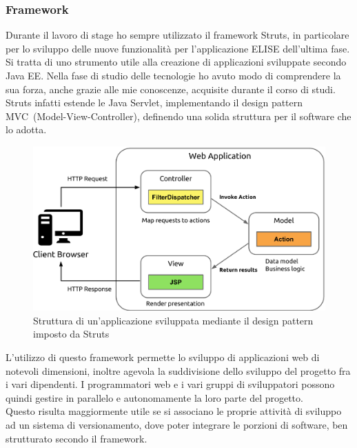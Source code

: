 	\subsubsection{Framework}
	Durante il lavoro di stage ho sempre utilizzato il framework Struts, in particolare per lo sviluppo delle nuove funzionalità per l'applicazione ELISE dell'ultima fase.\\
	
	Si tratta di uno strumento utile alla creazione di applicazioni sviluppate secondo Java EE. Nella fase di studio delle tecnologie ho avuto modo di comprendere la sua forza, anche grazie alle mie conoscenze, acquisite durante il corso di studi. Struts infatti estende le Java Servlet\glossario , implementando il design pattern MVC\glossario\ (Model-View-Controller), definendo una solida struttura per il software che lo adotta. 
	
	\begin{figure}[H]
		\centering
	   	\includegraphics[width=1\textwidth]{immagini/MVC_struts}
	   	\caption{Struttura di un'applicazione sviluppata mediante il design pattern imposto da Struts}
	\end{figure}	
	
	L'utilizzo di questo framework permette lo sviluppo di applicazioni web di notevoli dimensioni, inoltre agevola la suddivisione dello sviluppo del progetto fra i vari dipendenti. I programmatori web e i vari gruppi di sviluppatori possono quindi gestire in parallelo e autonomamente la loro parte del progetto.\\
	
	Questo risulta maggiormente utile se si associano le proprie attività di sviluppo ad un sistema di versionamento, dove poter integrare le porzioni di software, ben strutturato secondo il framework.
	
